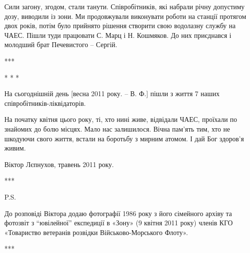 
Сили загону, згодом, стали танути. Співробітників, які набрали річну допустиму
дозу, виводили із зони. Ми продовжували виконувати роботи на станції протягом
двох років, потім було прийнято рішення створити свою водолазну службу на ЧАЕС.
Пішли туди працювати С. Марц і Н. Кошмяков. До них приєднався і молодший брат
Печевистого – Сергій.

***

* * *

На сьогоднішній день [весна 2011 року. – В. Ф.] пішли з життя 7 наших
співробітників-ліквідаторів. 

На початку квітня цього року, ті, хто нині живе, відвідали ЧАЕС, проїхали по
знайомих до болю місцях. Мало нас залишилося. Вічна пам'ять тим, хто не
шкодуючи свого життя, встали на боротьбу з мирним атомом. І дай Бог здоров'я
живим.

Віктор Лєпнухов, травень 2011 року.

***

P.S.

До розповіді Віктора додаю фотографії 1986 року з його сімейного архіву та
фотозвіт з \enquote{ювілейної} експедиції в «Зону» (9 квітня 2011 року) членів КГО
«Товариство ветеранів розвідки Військово-Морського Флоту».

***

